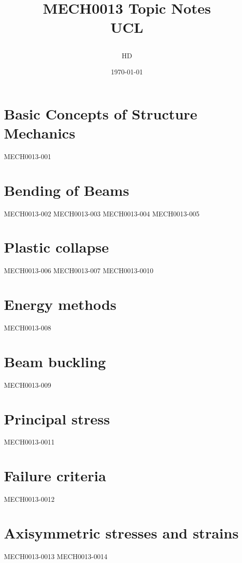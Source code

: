 \documentclass[12pt,a4paper, twoside]{report}
\begin{document}
\title{
  {MECH0013 Topic Notes}\\
  {\large UCL}
  \author{HD}
  \date{\today}
}
\maketitle
\tableofcontents
\chapter{Basic Concepts of Structure Mechanics}
{MECH0013-001}
\chapter{Bending of Beams}
{MECH0013-002}
{MECH0013-003}
{MECH0013-004}
{MECH0013-005}
\chapter{Plastic collapse}
{MECH0013-006}
{MECH0013-007}
{MECH0013-0010}
\chapter{Energy methods}
{MECH0013-008}
\chapter{Beam buckling}
{MECH0013-009}
\chapter{Principal stress}
{MECH0013-0011}
\chapter{Failure criteria}
{MECH0013-0012}
\chapter{Axisymmetric stresses and strains}
{MECH0013-0013}
{MECH0013-0014}
\end{document}
